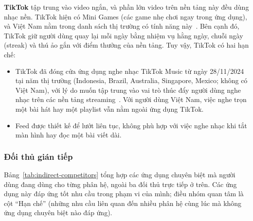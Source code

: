 \textbf{TikTok} tập trung vào video ngắn, và phần lớn video trên nền tảng này đều dùng nhạc nền.
TikTok hiện có Mini Games (các game nhẹ chơi ngay trong ứng dụng), và Việt Nam nằm trong danh sách thị trường có tính năng này~\cite{tiktok-minigames}.
Bên cạnh đó, TikTok giữ người dùng quay lại mỗi ngày bằng nhiệm vụ hằng ngày, chuỗi ngày (streak) và thú ảo gắn với điểm thưởng của nền tảng.
Tuy vậy, TikTok có hai hạn chế:
\begin{itemize}
    \item TikTok đã đóng cửa ứng dụng nghe nhạc TikTok Music từ ngày 28/11/2024 tại năm thị trường (Indonesia, Brazil, Australia, Singapore, Mexico; không có Việt Nam), với lý do muốn tập trung vào vai trò thúc đẩy người dùng nghe nhạc trên các nền tảng streaming~\cite{tiktok-music-shutdown}. Với người dùng Việt Nam, việc nghe trọn một bài hát hay một playlist vẫn nằm ngoài ứng dụng TikTok.
    \item Feed được thiết kế để lướt liên tục, không phù hợp với việc nghe nhạc khi tắt màn hình hay đọc một bài viết dài.
\end{itemize}

\subsubsection{Đối thủ gián tiếp}

Bảng~\ref{tab:indirect-competitors} tổng hợp các ứng dụng chuyên biệt mà người dùng đang dùng cho từng phân hệ, ngoài ba đối thủ trực tiếp ở trên.
Các ứng dụng này đáp ứng tốt nhu cầu trong phạm vi của mình; điều nhóm quan tâm là cột ``Hạn chế'' (những nhu cầu liên quan đến nhiều phân hệ cùng lúc mà không ứng dụng chuyên biệt nào đáp ứng).

